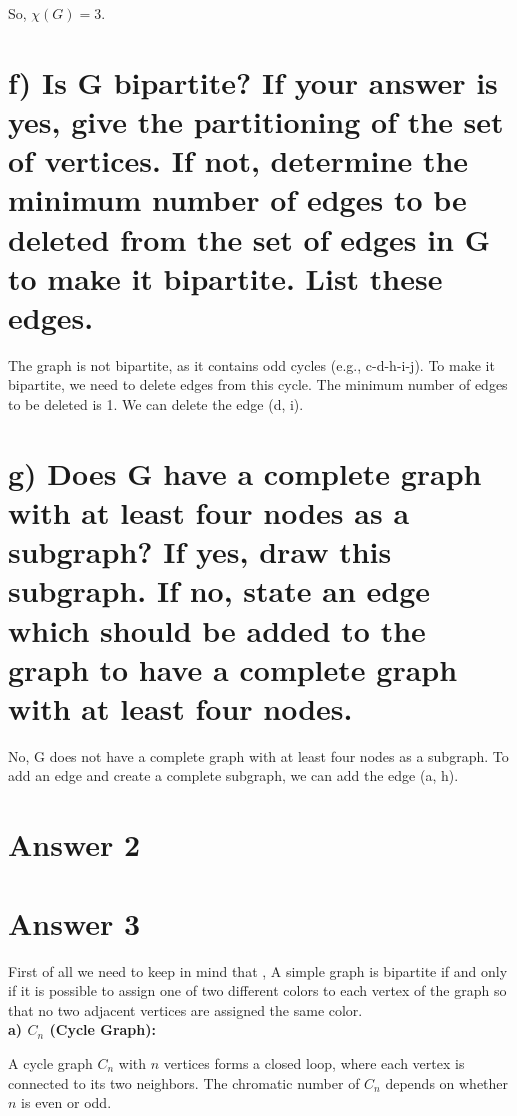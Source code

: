 \documentclass[12pt]{article}
\begin{document}
So, $\chi(G) = 3$.

\section*{f) Is G bipartite? If your answer is yes, give the partitioning of the set of vertices. If not, determine the minimum number of edges to be deleted from the set of edges in G to make it bipartite. List these edges.}

The graph is not bipartite, as it contains odd cycles (e.g., c-d-h-i-j). To make it bipartite, we need to delete edges from this cycle. The minimum number of edges to be deleted is 1. We can delete the edge (d, i).

\section*{g) Does G have a complete graph with at least four nodes as a subgraph? If yes, draw this subgraph. If no, state an edge which should be added to the graph to have a complete graph with at least four nodes.}

No, G does not have a complete graph with at least four nodes as a subgraph. To add an edge and create a complete subgraph, we can add the edge (a, h).



\section*{Answer 2}



\section*{Answer 3}
First of all we need to keep in mind that ,
A simple graph is bipartite if and only if it is possible to assign one of two different colors to each vertex of the graph so that no two adjacent vertices are assigned the same color.\\
\textbf{a) \(C_n\) (Cycle Graph):}

A cycle graph \(C_n\) with \(n\) vertices forms a closed loop, where each vertex is connected to its two neighbors. The chromatic number of \(C_n\) depends on whether \(n\) is even or odd.
\end{document}
